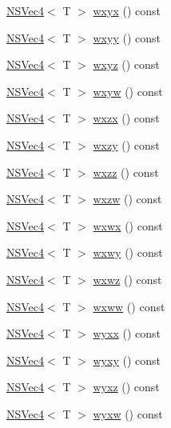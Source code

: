 \begin{DoxyCompactItemize}
\item 
\hyperlink{structNSVec4}{N\-S\-Vec4}$<$ T $>$ \hyperlink{structNSVec4_ae8df456c715055fb54b6a910887e6c4e}{wxyx} () const 
\item 
\hyperlink{structNSVec4}{N\-S\-Vec4}$<$ T $>$ \hyperlink{structNSVec4_ad01059811ae28c1ece61a39372c76d01}{wxyy} () const 
\item 
\hyperlink{structNSVec4}{N\-S\-Vec4}$<$ T $>$ \hyperlink{structNSVec4_a3083f61af7aab4a3ab23c61964bac0a6}{wxyz} () const 
\item 
\hyperlink{structNSVec4}{N\-S\-Vec4}$<$ T $>$ \hyperlink{structNSVec4_aa25b6eec2fc7d4b7f5f505776a1859a4}{wxyw} () const 
\item 
\hyperlink{structNSVec4}{N\-S\-Vec4}$<$ T $>$ \hyperlink{structNSVec4_a60fb43704650166f8b5e2182fef6b35d}{wxzx} () const 
\item 
\hyperlink{structNSVec4}{N\-S\-Vec4}$<$ T $>$ \hyperlink{structNSVec4_a1aadb668f84b06d77b7b9941a4b172de}{wxzy} () const 
\item 
\hyperlink{structNSVec4}{N\-S\-Vec4}$<$ T $>$ \hyperlink{structNSVec4_a4b62914792b804823df77ed3d83181af}{wxzz} () const 
\item 
\hyperlink{structNSVec4}{N\-S\-Vec4}$<$ T $>$ \hyperlink{structNSVec4_afe8141bc19337ac4e7c2943565319f0a}{wxzw} () const 
\item 
\hyperlink{structNSVec4}{N\-S\-Vec4}$<$ T $>$ \hyperlink{structNSVec4_aba737d6dd72f5d56a0aac52726b4d3fb}{wxwx} () const 
\item 
\hyperlink{structNSVec4}{N\-S\-Vec4}$<$ T $>$ \hyperlink{structNSVec4_ae1d43bfd8968ae2329795293c29ef568}{wxwy} () const 
\item 
\hyperlink{structNSVec4}{N\-S\-Vec4}$<$ T $>$ \hyperlink{structNSVec4_a5860a24345deafc96dfa5b5b0b001d07}{wxwz} () const 
\item 
\hyperlink{structNSVec4}{N\-S\-Vec4}$<$ T $>$ \hyperlink{structNSVec4_a7a6f6c6c5d2dc9a8796a30d2b4b22dce}{wxww} () const 
\item 
\hyperlink{structNSVec4}{N\-S\-Vec4}$<$ T $>$ \hyperlink{structNSVec4_a915cfa784d0c84b39fd89ed731f625f3}{wyxx} () const 
\item 
\hyperlink{structNSVec4}{N\-S\-Vec4}$<$ T $>$ \hyperlink{structNSVec4_a92cb04052a2775d558e048c2df649465}{wyxy} () const 
\item 
\hyperlink{structNSVec4}{N\-S\-Vec4}$<$ T $>$ \hyperlink{structNSVec4_a8f8ffa8987f64ddbd71045f2e8ef998a}{wyxz} () const 
\item 
\hyperlink{structNSVec4}{N\-S\-Vec4}$<$ T $>$ \hyperlink{structNSVec4_a59683ab6f3eaa4f0b5c68f1344fba563}{wyxw} () const 

\end{DoxyCompactItemize}
